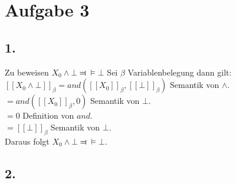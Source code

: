 \section*{Aufgabe 3}

\subsection*{1.}
Zu beweisen $X_0 \wedge \bot \Dashv \vDash \bot$
Sei $\beta$ Variablenbelegung dann gilt: \\
$[[X_0 \wedge \bot]]_\beta = and([[X_0]]_\beta, [[\bot]]_\beta)$ Semantik von $\wedge$.\\
$= and([[X_0]]_\beta, 0)$ Semantik von $\bot$.\\
$= 0$ Definition von $and$.\\
$= [[\bot]]_\beta$ Semantik von $\bot$.\\
Daraus folgt $X_0 \wedge \bot \Dashv \vDash \bot$.

\subsection*{2.}